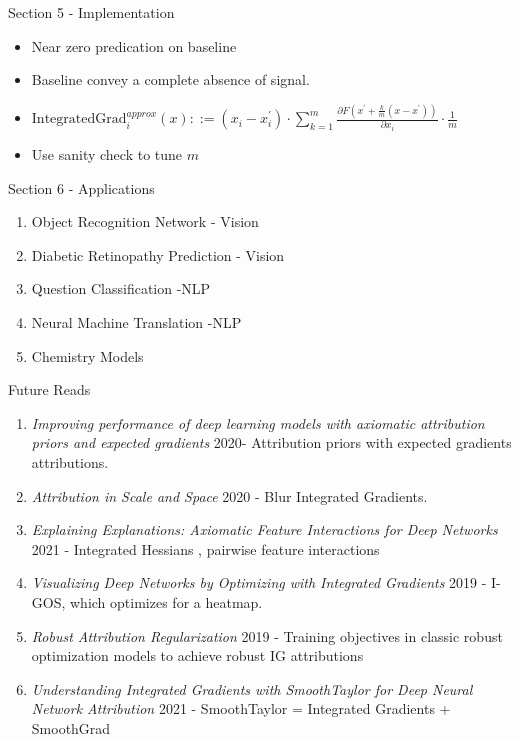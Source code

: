 \documentclass[serif]{beamer}
\begin{document}
\begin{frame}{Section 5 - Implementation}
	\begin{itemize}
		\item Near zero predication on baseline 
		\item Baseline convey a complete absence of signal.
		\item $\text{IntegratedGrad}_i^{approx}(x)::= (x_i - x_i^\prime) \cdot \sum_{k=1}^m \frac{\partial F(x^\prime + \frac{k}{m}(x-x^\prime))}{\partial x_i}  \cdot \frac{1}{m}$
		\item Use sanity check to tune $m$
	\end{itemize}
\end{frame}

\begin{frame}{Section 6 - Applications}
	\begin{enumerate}
		\item Object Recognition Network - Vision
		\item Diabetic Retinopathy Prediction - Vision
		\item Question Classification -NLP
		\item Neural Machine Translation -NLP
		\item Chemistry Models
	\end{enumerate}
\end{frame}


\begin{frame}{Future Reads}
	\begin{enumerate}
		\item \textit{Improving performance of deep learning models with axiomatic attribution priors and expected gradients} 2020- Attribution priors with expected gradients attributions.
		\item \textit{Attribution in Scale and Space} 2020 - Blur Integrated Gradients.
		\item \textit{Explaining Explanations: Axiomatic Feature Interactions for
			Deep Networks} 2021 - Integrated Hessians , pairwise feature interactions 
		\item \textit{Visualizing Deep Networks by Optimizing with Integrated Gradients} 2019 - 
		I-GOS, which optimizes for a heatmap.
		\item \textit{Robust Attribution Regularization} 2019 - Training objectives in classic robust optimization models to achieve robust IG attributions
		\item \textit{Understanding Integrated Gradients with SmoothTaylor for Deep Neural Network Attribution}  2021 - SmoothTaylor = Integrated Gradients + SmoothGrad
	\end{enumerate}
\end{frame}
\end{document}
